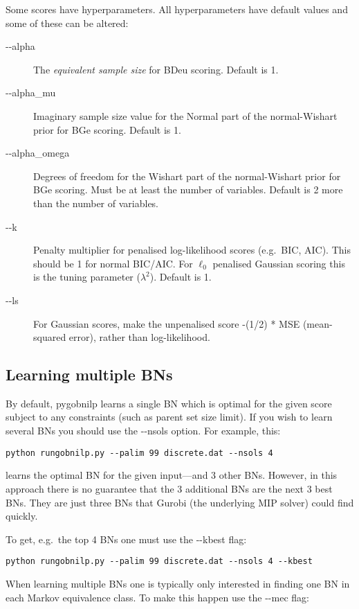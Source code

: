 \documentclass{article}
\newcommand{\pygobnilp}{\textsf{pygobnilp}}
\begin{document}
Some scores have hyperparameters. All hyperparameters have default
values and some of these can be altered:

\begin{description}
\item[-{}-alpha] The \emph{equivalent sample size} for BDeu
  scoring. Default is 1.
\item[-{}-alpha\_mu] Imaginary sample size value for the Normal part of the
  normal-Wishart prior for BGe scoring. Default
  is 1.
\item[-{}-alpha\_omega] Degrees of freedom for
  the Wishart part of the normal-Wishart prior
  for BGe scoring. Must be at least the number
  of variables. Default is 2 more than the
  number of variables.
\item[-{}-k] Penalty multiplier for penalised log-likelihood scores
  (e.g.\ BIC, AIC). This should be 1 for normal BIC/AIC. For $\ell_0$
  penalised Gaussian scoring this is the tuning parameter ($\lambda^2$).
  Default is 1.
\item[-{}-ls] For Gaussian scores, make
  the unpenalised score -(1/2) * MSE (mean-squared
  error), rather than log-likelihood.
\end{description}

\subsection{Learning multiple BNs}
\label{sec:multiple}

By default, \pygobnilp{} learns a single BN which is optimal for the
given score subject to any constraints (such as parent set size
limit). If you wish to learn several BNs you should use the -{}-nsols
option. For example, this:
\begin{verbatim}
python rungobnilp.py --palim 99 discrete.dat --nsols 4
\end{verbatim}
learns the optimal BN for the given input---and 3 other BNs. However,
in this approach there is no guarantee that the 3 additional BNs are
the next 3 best BNs. They are just three BNs that Gurobi (the
underlying MIP solver) could find quickly.

To get, e.g.\ the top 4 BNs one must use the -{}-kbest flag:
\begin{verbatim}
python rungobnilp.py --palim 99 discrete.dat --nsols 4 --kbest
\end{verbatim}

When learning multiple BNs one is typically only interested in finding
one BN in each Markov equivalence class. To make this happen use the
-{}-mec flag:
\end{document}
